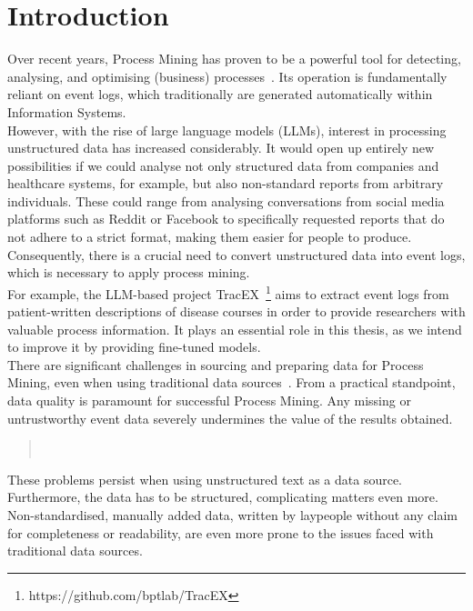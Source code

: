 \section{Introduction}\label{sec:intro}
Over recent years, Process Mining has proven to be a powerful tool for detecting, analysing, and optimising (business) processes~\cite{weske_business_2012}. Its operation is fundamentally reliant on event logs, which traditionally are generated automatically within Information Systems.\\
However, with the rise of large language models (LLMs), interest in processing unstructured data has increased considerably. It would open up entirely new possibilities if we could analyse not only structured data from companies and healthcare systems, for example, but also non-standard reports from arbitrary individuals. These could range from analysing conversations from social media platforms such as Reddit or Facebook to specifically requested reports that do not adhere to a strict format, making them easier for people to produce.\\
Consequently, there is a crucial need to convert unstructured data into event logs, which is necessary to apply process mining.
\\
For example, the LLM-based project TracEX~\footnote{https://github.com/bptlab/TracEX} aims to extract event logs from patient-written descriptions of disease courses in order to provide researchers with valuable process information. It plays an essential role in this thesis, as we intend to improve it by providing fine-tuned models.\\
There are significant challenges in sourcing and preparing data for Process Mining, even when using traditional data sources~\cite{van_der_aalst_process_2016}. From a practical standpoint, data quality is paramount for successful Process Mining. Any missing or untrustworthy event data severely undermines the value of the results obtained. 
\begin{quote}
    ~\cite{van_der_aalst_process_2016}    
\end{quote}
These problems persist when using unstructured text as a data source. Furthermore, the data has to be structured, complicating matters even more. Non-standardised, manually added data,  written by laypeople without any claim for completeness or readability, are even more prone to the issues faced with traditional data sources.\\
